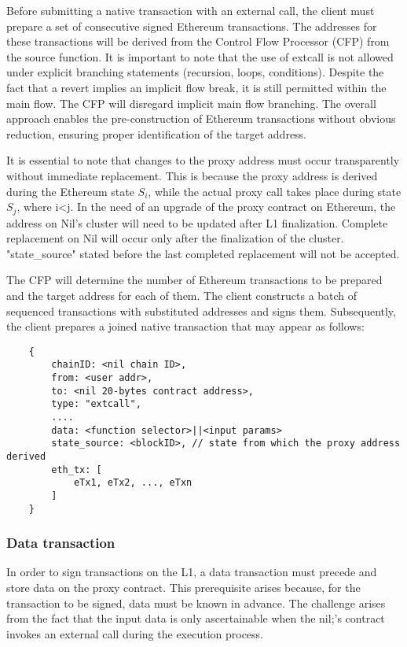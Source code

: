 Before submitting a native transaction with an external call, the client must prepare a set of 
consecutive signed Ethereum transactions. The addresses for these transactions will be derived 
from the Control Flow Processor (CFP) from the source function. It is important to note that the 
use of extcall is not allowed under explicit branching statements (recursion, loops, conditions). 
Despite the fact that a revert implies an implicit flow break, it is still permitted within the 
main flow. The CFP will disregard implicit main flow branching. The overall approach enables the 
pre-construction of Ethereum transactions without obvious reduction, ensuring proper 
identification of the target address.

It is essential to note that changes to the proxy address must occur transparently without 
immediate replacement. This is because the proxy address is derived during the Ethereum state 
\( S_i \), while the actual proxy call takes place during state \( S_j \), where i<j. In the 
need of an upgrade of the proxy contract on Ethereum, the address on Nil's cluster will need to 
be updated after L1 finalization. Complete replacement on Nil will occur only after the 
finalization of the cluster. "state\_source" stated before the last completed replacement will 
not be accepted.

The CFP will determine the number of Ethereum transactions to be prepared and the target address 
for each of them. The client constructs a batch of sequenced transactions with substituted 
addresses and signs them. Subsequently, the client prepares a joined native transaction that 
may appear as follows:

\begin{verbatim}
    {
        chainID: <nil chain ID>,
        from: <user addr>,
        to: <nil 20-bytes contract address>,
        type: "extcall",
        ....
        data: <function selector>||<input params>
        state_source: <blockID>, // state from which the proxy address derived
        eth_tx: [
            eTx1, eTx2, ..., eTxn
        ]
    }
\end{verbatim}


\subsubsection{Data transaction}
In order to sign transactions on the L1, a data transaction must precede and store data on the 
proxy contract. This prerequisite arises because, for the transaction to be signed, data must 
be known in advance. The challenge arises from the fact that the input data is only 
ascertainable when the nil;'s contract invokes an external call during the execution process. 

